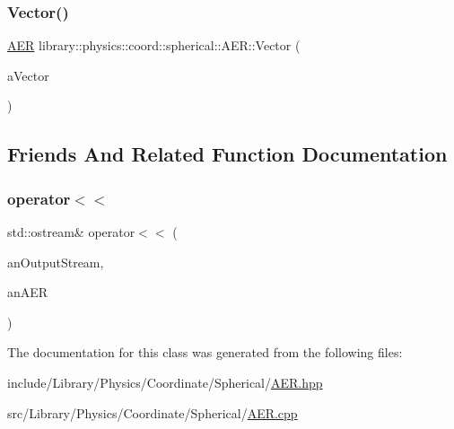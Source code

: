 \subsubsection{\texorpdfstring{Vector()}{Vector()}}
{\footnotesize\ttfamily \hyperlink{classlibrary_1_1physics_1_1coord_1_1spherical_1_1_a_e_r}{A\+ER} library\+::physics\+::coord\+::spherical\+::\+A\+E\+R\+::\+Vector (\begin{DoxyParamCaption}\item[{const Vector3d \&}]{a\+Vector }\end{DoxyParamCaption})\hspace{0.3cm}{\ttfamily [static]}}



\subsection{Friends And Related Function Documentation}
\mbox{\label{classlibrary_1_1physics_1_1coord_1_1spherical_1_1_a_e_r_ac5514fc65bf0bd3f4f5870b246cff3ad}} 
\subsubsection{\texorpdfstring{operator$<$$<$}{operator<<}}
{\footnotesize\ttfamily std\+::ostream\& operator$<$$<$ (\begin{DoxyParamCaption}\item[{std\+::ostream \&}]{an\+Output\+Stream,  }\item[{const \hyperlink{classlibrary_1_1physics_1_1coord_1_1spherical_1_1_a_e_r}{A\+ER} \&}]{an\+A\+ER }\end{DoxyParamCaption})\hspace{0.3cm}{\ttfamily [friend]}}



The documentation for this class was generated from the following files\+:\begin{DoxyCompactItemize}
\item 
include/\+Library/\+Physics/\+Coordinate/\+Spherical/\hyperlink{_a_e_r_8hpp}{A\+E\+R.\+hpp}\item 
src/\+Library/\+Physics/\+Coordinate/\+Spherical/\hyperlink{_a_e_r_8cpp}{A\+E\+R.\+cpp}\end{DoxyCompactItemize}
